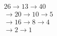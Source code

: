 \documentclass[preview]{standalone}
\begin{document}
\begin{align*}
26 \longrightarrow 13 \longrightarrow 40  \\\longrightarrow 20 \longrightarrow 10 \longrightarrow 5 \\\longrightarrow 16 \longrightarrow 8 \longrightarrow 4 \\\longrightarrow 2 \longrightarrow 1
\end{align*}
\end{document}
